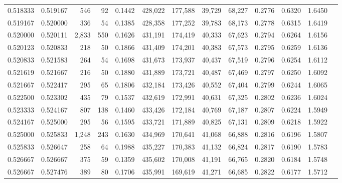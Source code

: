 \begin{tabular}{rrrrrrrrrrrrr}
0.518333 & 0.519167 &   546 &  92 &                                     0.1442 & 428,022 & 177,588 &  39,729 &  68,227 & 0.2776 & 0.6320 & 1.6450 \\
0.519167 & 0.520000 &   336 &  54 &                                     0.1385 & 428,358 & 177,252 &  39,783 &  68,173 & 0.2778 & 0.6315 & 1.6419 \\
0.520000 & 0.520111 & 2,833 & 550 &                                     0.1626 & 431,191 & 174,419 &  40,333 &  67,623 & 0.2794 & 0.6264 & 1.6156 \\
0.520123 & 0.520833 &   218 &  50 &                                     0.1866 & 431,409 & 174,201 &  40,383 &  67,573 & 0.2795 & 0.6259 & 1.6136 \\
0.520833 & 0.521583 &   264 &  54 &                                     0.1698 & 431,673 & 173,937 &  40,437 &  67,519 & 0.2796 & 0.6254 & 1.6112 \\
0.521619 & 0.521667 &   216 &  50 &                                     0.1880 & 431,889 & 173,721 &  40,487 &  67,469 & 0.2797 & 0.6250 & 1.6092 \\
0.521667 & 0.522417 &   295 &  65 &                                     0.1806 & 432,184 & 173,426 &  40,552 &  67,404 & 0.2799 & 0.6244 & 1.6065 \\
0.522500 & 0.523302 &   435 &  79 &                                     0.1537 & 432,619 & 172,991 &  40,631 &  67,325 & 0.2802 & 0.6236 & 1.6024 \\
0.523333 & 0.524167 &   807 & 138 &                                     0.1460 & 433,426 & 172,184 &  40,769 &  67,187 & 0.2807 & 0.6224 & 1.5949 \\
0.524167 & 0.525000 &   295 &  56 &                                     0.1595 & 433,721 & 171,889 &  40,825 &  67,131 & 0.2809 & 0.6218 & 1.5922 \\
0.525000 & 0.525833 & 1,248 & 243 &                                     0.1630 & 434,969 & 170,641 &  41,068 &  66,888 & 0.2816 & 0.6196 & 1.5807 \\
0.525833 & 0.526647 &   258 &  64 &                                     0.1988 & 435,227 & 170,383 &  41,132 &  66,824 & 0.2817 & 0.6190 & 1.5783 \\
0.526667 & 0.526667 &   375 &  59 &                                     0.1359 & 435,602 & 170,008 &  41,191 &  66,765 & 0.2820 & 0.6184 & 1.5748 \\
0.526667 & 0.527476 &   389 &  80 &                                     0.1706 & 435,991 & 169,619 &  41,271 &  66,685 & 0.2822 & 0.6177 & 1.5712 \\

\end{tabular}
